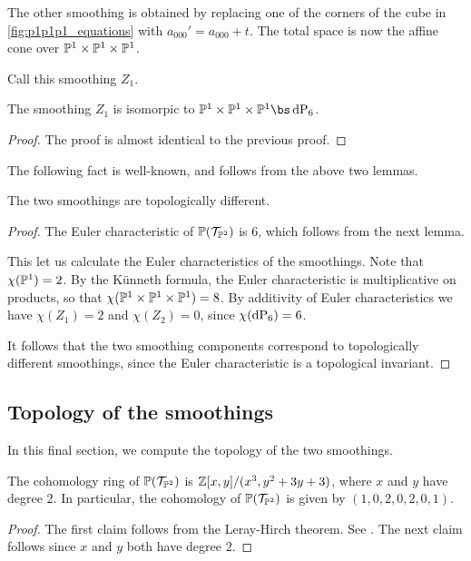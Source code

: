 The other smoothing is obtained by replacing one of the corners of the cube in \cref{fig:p1p1p1_equations} with $a_{000}'=a_{000}+t$. The total space is now the affine cone over $\P^1 \times \P^1 \times \P^1$. 

Call this smoothing $Z_1.$

\begin{lemma}
The smoothing $Z_1$ is isomorpic to $\P^1 \times \P^1 \times \P^1 \bs \dP6$.
\end{lemma}
\begin{proof}
The proof is almost identical to the previous proof.
\end{proof}

The following fact is well-known, and follows from the above two lemmas.

\begin{proposition}
The two smoothings are topologically different.
\end{proposition}
\begin{proof}
The Euler characteristic of $\P(\mathcal T_{\P^2})$ is $6$, which follows from the next lemma.

This let us calculate the Euler characteristics of the smoothings. Note that $\chi(\P^1)=2$. By the Künneth formula, the Euler characteristic is multiplicative on products, so that $\chi(\P^1 \times \P^1 \times \P^1)=8$. By additivity of Euler characteristics we have $\chi(Z_1)=2$ and $\chi(Z_2)=0$, since $\chi(\dP6)=6$.

It follows that the two smoothing components correspond to topologically different smoothings, since the Euler characteristic is a topological invariant.
\end{proof}

\subsection{Topology of the smoothings}

In this final section, we compute the topology of the two smoothings.

\begin{lemma}
The cohomology ring of $\P(\mathcal T_{\P^2})$ is $\Z[x,y]/(x^3,y^2+3y+3)$, where $x$ and $y$ have degree $2$. In particular, the cohomology of $\P(\mathcal T_{\P^2})$ is given by $(1,0,2,0,2,0,1)$.
\end{lemma}
\begin{proof}
The first claim follows from the Leray-Hirch theorem. See \cite[page 270]{bott_tu}. The next claim follows since $x$ and $y$ both have degree $2$.
\end{proof}

